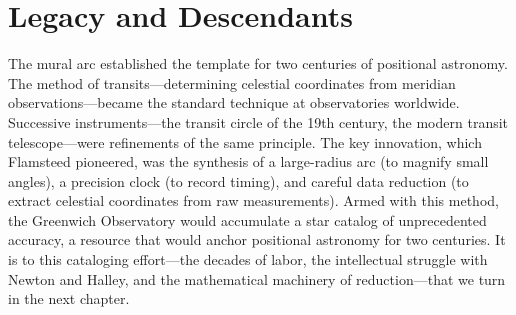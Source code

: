 \section{Legacy and Descendants}

The mural arc established the template for two centuries of positional astronomy. The method of transits—determining celestial coordinates from meridian observations—became the standard technique at observatories worldwide. Successive instruments—the transit circle of the 19th century, the modern transit telescope—were refinements of the same principle. The key innovation, which Flamsteed pioneered, was the synthesis of a large-radius arc (to magnify small angles), a precision clock (to record timing), and careful data reduction (to extract celestial coordinates from raw measurements). Armed with this method, the Greenwich Observatory would accumulate a star catalog of unprecedented accuracy, a resource that would anchor positional astronomy for two centuries. It is to this cataloging effort—the decades of labor, the intellectual struggle with Newton and Halley, and the mathematical machinery of reduction—that we turn in the next chapter.

